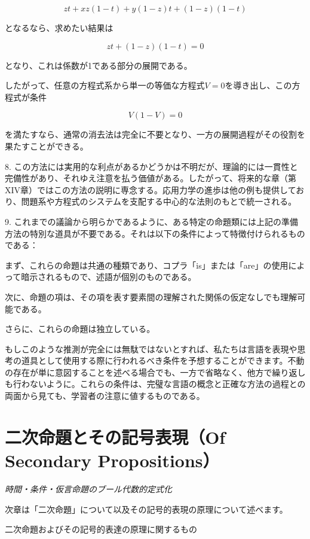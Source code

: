 \documentclass[a4paper,11pt,openany]{ltjsbook}
\begin{document}
\[
zt + xz(1 - t) + y (1 - z) t + (1 - z) (1 - t)
\]

となるなら、求めたい結果は

\[
zt + (1 - z) (1 - t) = 0
\]

となり、これは係数が1である部分の展開である。

したがって、任意の方程式系から単一の等価な方程式$V = 0$を導き出し、この方程式が条件

\[
V(1 - V) = 0
\]

を満たすなら、通常の消去法は完全に不要となり、一方の展開過程がその役割を果たすことができる。

8. この方法には実用的な利点があるかどうかは不明だが、理論的には一貫性と完備性があり、それゆえ注意を払う価値がある。したがって、将来的な章（第XIV章）ではこの方法の説明に専念する。応用力学の進歩は他の例も提供しており、問題系や方程式のシステムを支配する中心的な法則のもとで統一される。

9. これまでの議論から明らかであるように、ある特定の命題類には上記の準備方法の特別な道具が不要である。それは以下の条件によって特徴付けられるものである：

まず、これらの命題は共通の種類であり、コプラ「is」または「are」の使用によって暗示されるもので、述語が個別のものである。

次に、命題の項は、その項を表す要素間の理解された関係の仮定なしでも理解可能である。

さらに、これらの命題は独立している。

もしこのような推測が完全には無駄ではないとすれば、私たちは言語を表現や思考の道具として使用する際に行われるべき条件を予想することができます。不動の存在が単に意図することを述べる場合でも、一方で省略なく、他方で繰り返しも行わないように。これらの条件は、完璧な言語の概念と正確な方法の過程との両面から見ても、学習者の注意に値するものである。

\newpage

\chapter{二次命題とその記号表現（Of Secondary Propositions）}
\label{ch:xi}

\begin{center}
\large\textit{時間・条件・仮言命題のブール代数的定式化}
\end{center}
\vspace{4mm}

次章は「二次命題」について以及その記号的表現の原理について述べます。

{\large 二次命題およびその記号的表達の原理に関するもの}
\end{document}
